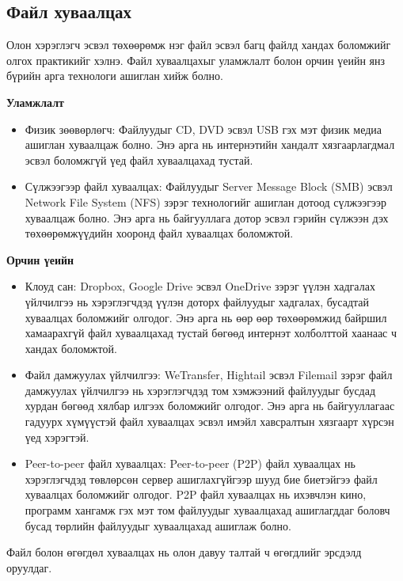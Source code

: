 \subsection{Файл хуваалцах}
Олон хэрэглэгч эсвэл төхөөрөмж нэг файл эсвэл багц файлд хандах боломжийг олгох практикийг хэлнэ. Файл хуваалцахыг уламжлалт болон орчин үеийн янз бүрийн арга технологи ашиглан хийж болно.

\textbf{Уламжлалт}
\begin{itemize}
    \item Физик зөөвөрлөгч: Файлуудыг CD, DVD эсвэл USB гэх мэт физик медиа ашиглан хуваалцаж болно. Энэ арга нь интернэтийн хандалт хязгаарлагдмал эсвэл боломжгүй үед файл хуваалцахад тустай.
    \item Сүлжээгээр файл хуваалцах: Файлуудыг Server Message Block (SMB) эсвэл Network File System (NFS) зэрэг технологийг ашиглан дотоод сүлжээгээр хуваалцаж болно. Энэ арга нь байгууллага дотор эсвэл гэрийн сүлжээн дэх төхөөрөмжүүдийн хооронд файл хуваалцах боломжтой.
\end{itemize}

\textbf{Орчин үеийн}
\begin{itemize}
    \item Клоуд сан: Dropbox, Google Drive эсвэл OneDrive зэрэг үүлэн хадгалах үйлчилгээ нь хэрэглэгчдэд үүлэн доторх файлуудыг хадгалах, бусадтай хуваалцах боломжийг олгодог. Энэ арга нь өөр өөр төхөөрөмжид байршил хамаарахгүй файл хуваалцахад тустай бөгөөд интернэт холболттой хаанаас ч хандах боломжтой.
    \item Файл дамжуулах үйлчилгээ: WeTransfer, Hightail эсвэл Filemail зэрэг файл дамжуулах үйлчилгээ нь хэрэглэгчдэд том хэмжээний файлуудыг бусдад хурдан бөгөөд хялбар илгээх боломжийг олгодог. Энэ арга нь байгууллагаас гадуурх хүмүүстэй файл хуваалцах эсвэл имэйл хавсралтын хязгаарт хүрсэн үед хэрэгтэй.
    \item Peer-to-peer файл хуваалцах: Peer-to-peer (P2P) файл хуваалцах нь хэрэглэгчдэд төвлөрсөн сервер ашиглахгүйгээр шууд бие биетэйгээ файл хуваалцах боломжийг олгодог. P2P файл хуваалцах нь ихэвчлэн кино, программ хангамж гэх мэт том файлуудыг хуваалцахад ашиглагддаг боловч бусад төрлийн файлуудыг хуваалцахад ашиглаж болно.
\end{itemize}
Файл болон өгөгдөл хуваалцах нь олон давуу талтай ч өгөгдлийг эрсдэлд оруулдаг.

